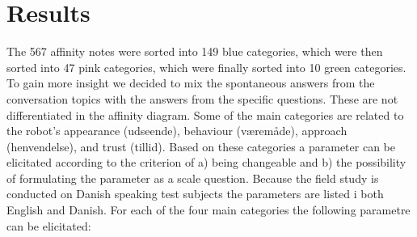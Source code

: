 \section{Results}
\label{Results}
%
The 567 affinity notes were sorted into 149 blue categories, which were then sorted into 47 pink categories, which were finally sorted into 10 green categories. To gain more insight we decided to mix the spontaneous answers from the conversation topics with the answers from the specific questions. These are not differentiated in the affinity diagram. Some of the main categories are related to the robot’s appearance (udseende), behaviour (væremåde), approach (henvendelse), and trust (tillid). Based on these categories a parameter can be elicitated according to the criterion of a) being changeable and b) the possibility of formulating the parameter as a scale question. Because the field study is conducted on Danish speaking test subjects the parameters are listed i both English and Danish. For each of the four main categories the following parametre can be elicitated:\\
%
